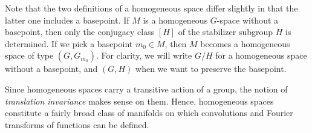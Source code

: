 Note that the two definitions of a homogeneous space differ slightly in that the latter one includes a basepoint. If $M$ is a homogeneous $G$-space without a basepoint, then only the conjugacy class $[H]$ of the stabilizer subgroup $H$ is determined. If we pick a basepoint $m_0\in M$, then $M$ becomes a homogeneous space of type $(G,G_{m_0})$. For clarity, we will write $G\slash H$ for a homogeneous space without a basepoint, and $(G,H)$ when we want to preserve the basepoint.

\begin{rem}
    Since homogeneous spaces carry a transitive action of a group, the notion of \emph{translation invariance} makes sense on them. Hence, homogeneous spaces constitute a fairly broad class of manifolds on which convolutions and Fourier transforms of functions can be defined.
\end{rem}

